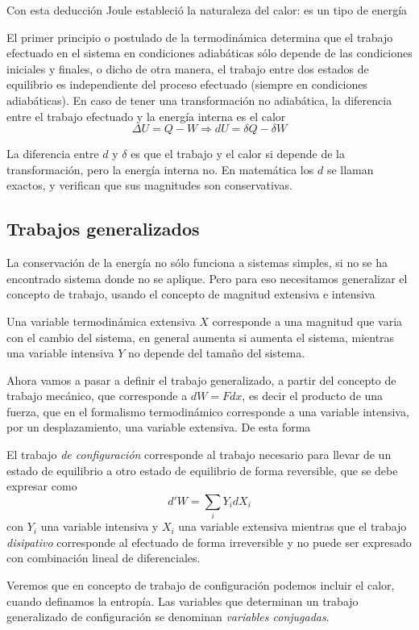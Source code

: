 Con esta deducción Joule estableció la naturaleza del calor: es un tipo de energía
\begin{law}
El primer principio o postulado de la termodinámica determina que el trabajo efectuado en el sistema en condiciones adiabáticas sólo depende de las condiciones iniciales y finales, o dicho de otra manera, el trabajo entre dos estados de equilibrio es independiente del proceso efectuado (siempre en condiciones adiabáticas). En caso de tener una transformación no adiabática, la diferencia entre el trabajo efectuado y la energía interna es el calor
\begin{equation}
\Delta U = Q - W \Rightarrow dU = \delta Q - \delta W
\end{equation}
\end{law}
La diferencia entre $d$ y $\delta$ es que el trabajo y el calor si depende de la transformación, pero la energía interna no. En matemática los $d$ se llaman exactos, y verifican que sus magnitudes son conservativas.
\subsection{Trabajos generalizados}
La conservación de la energía no sólo funciona a sistemas simples, si no se ha encontrado sistema donde no se aplique. Pero para eso necesitamos generalizar el concepto de trabajo, usando el concepto de magnitud extensiva e intensiva
\begin{definition}
Una variable termodinámica extensiva $X$ corresponde a una magnitud que varia con el cambio del sistema, en general aumenta si aumenta el sistema, mientras una variable intensiva $Y$ no depende del tamaño del sistema.
\end{definition}
Ahora vamos a pasar a definir el trabajo generalizado, a partir del concepto de trabajo mecánico, que corresponde a $dW = F dx$, es decir el producto de una fuerza, que en el formalismo termodinámico corresponde a una variable intensiva, por un desplazamiento, una variable extensiva. De esta forma
\begin{definition}
El trabajo \textit{de configuración} corresponde al trabajo necesario para llevar de un estado de equilibrio a otro estado de equilibrio de forma reversible, que se debe expresar como
\begin{equation}
d'W = \sum_i Y_i dX_i
\end{equation}
con $Y_i$ una variable intensiva y $X_i$ una variable extensiva
mientras que el trabajo \textit{disipativo} corresponde al efectuado de forma irreversible y no puede ser expresado con combinación lineal de diferenciales.
\end{definition}
Veremos que en concepto de trabajo de configuración podemos incluir el calor, cuando definamos la entropía.
Las variables que determinan un trabajo generalizado de configuración se denominan \emph{variables conjugadas}.
